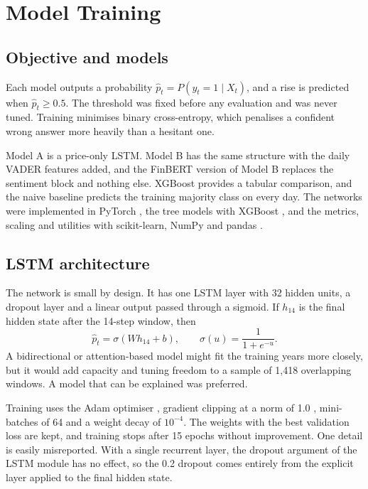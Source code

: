 \section{Model Training}
\label{ch:training}
\subsection{Objective and models}
Each model outputs a probability $\hat p_t=P(y_t=1\mid X_t)$, and a rise is predicted when $\hat p_t\geq0.5$. The threshold was fixed before any evaluation and was never tuned. Training minimises binary cross-entropy, which penalises a confident wrong answer more heavily than a hesitant one.

Model A is a price-only LSTM. Model B has the same structure with the daily VADER features added, and the FinBERT version of Model B replaces the sentiment block and nothing else. XGBoost provides a tabular comparison, and the naive baseline predicts the training majority class on every day. The networks were implemented in PyTorch \cite{paszke2019}, the tree models with XGBoost \cite{chen2016}, and the metrics, scaling and utilities with scikit-learn, NumPy and pandas \cite{pedregosa2011,harris2020,mckinney2010}.

\subsection{LSTM architecture}
The network is small by design. It has one LSTM layer with 32 hidden units, a dropout layer \cite{srivastava2014} and a linear output passed through a sigmoid. If $h_{14}$ is the final hidden state after the 14-step window, then
\begin{equation}
\hat p_t=\sigma(Wh_{14}+b), \qquad \sigma(u)=\frac{1}{1+e^{-u}}.
\end{equation}
A bidirectional or attention-based model might fit the training years more closely, but it would add capacity and tuning freedom to a sample of 1,418 overlapping windows. A model that can be explained was preferred.

Training uses the Adam optimiser \cite{kingma2015}, gradient clipping at a norm of 1.0 \cite{pascanu2013}, mini-batches of 64 and a weight decay of $10^{-4}$. The weights with the best validation loss are kept, and training stops after 15 epochs without improvement. One detail is easily misreported. With a single recurrent layer, the dropout argument of the LSTM module has no effect, so the 0.2 dropout comes entirely from the explicit layer applied to the final hidden state.

